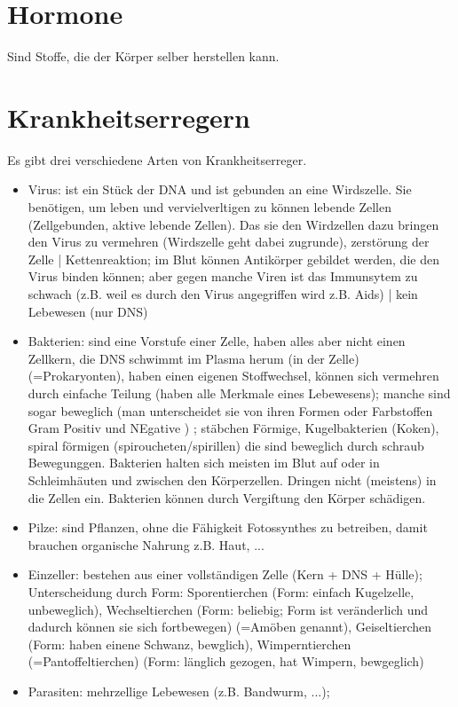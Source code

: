 \documentclass[a4paper]{article}
\begin{document}
\section{Hormone}

Sind Stoffe, die der Körper selber herstellen kann.

\section{Krankheitserregern}

Es gibt drei verschiedene Arten von Krankheitserreger.

\begin{itemize}
\item Virus: ist ein Stück der DNA und ist gebunden an eine Wirdszelle. Sie benötigen, um leben und vervielverltigen zu können lebende Zellen (Zellgebunden, aktive lebende Zellen). Das sie den Wirdzellen dazu bringen den Virus zu vermehren (Wirdszelle geht dabei zugrunde), zerstörung der Zelle | Kettenreaktion; im Blut können Antikörper gebildet werden, die den Virus binden können; aber gegen manche Viren ist das Immunsytem zu schwach (z.B. weil es durch den Virus angegriffen wird z.B. Aids) | kein Lebewesen (nur DNS)

\item Bakterien:  sind eine Vorstufe einer Zelle, haben alles aber nicht einen Zellkern, die DNS schwimmt im Plasma herum (in der Zelle) (=Prokaryonten), haben einen eigenen Stoffwechsel, können sich vermehren durch einfache Teilung (haben alle Merkmale eines Lebewesens); manche sind sogar beweglich (man unterscheidet sie von ihren Formen oder Farbstoffen Gram Positiv und NEgative ) ; stäbchen Förmige, Kugelbakterien (Koken), spiral förmigen (spiroucheten/spirillen) die sind beweglich durch schraub Bewegunggen. Bakterien halten sich meisten im Blut auf oder in Schleimhäuten und zwischen den Körperzellen. Dringen nicht (meistens) in die Zellen ein. Bakterien können durch Vergiftung den Körper schädigen.

\item Pilze: sind Pflanzen, ohne die Fähigkeit Fotossynthes zu betreiben, damit brauchen organische Nahrung z.B. Haut, ...

\item Einzeller: bestehen aus einer vollständigen Zelle (Kern + DNS + Hülle); Unterscheidung durch Form: Sporentierchen (Form: einfach Kugelzelle, unbeweglich), Wechseltierchen (Form: beliebig; Form ist veränderlich und dadurch können sie sich fortbewegen) (=Amöben genannt), Geiseltierchen (Form: haben einene Schwanz, bewglich), Wimperntierchen (=Pantoffeltierchen) (Form: länglich gezogen, hat Wimpern, bewgeglich)

\item Parasiten: mehrzellige Lebewesen (z.B. Bandwurm, ...);
\end{itemize}
\end{document}
